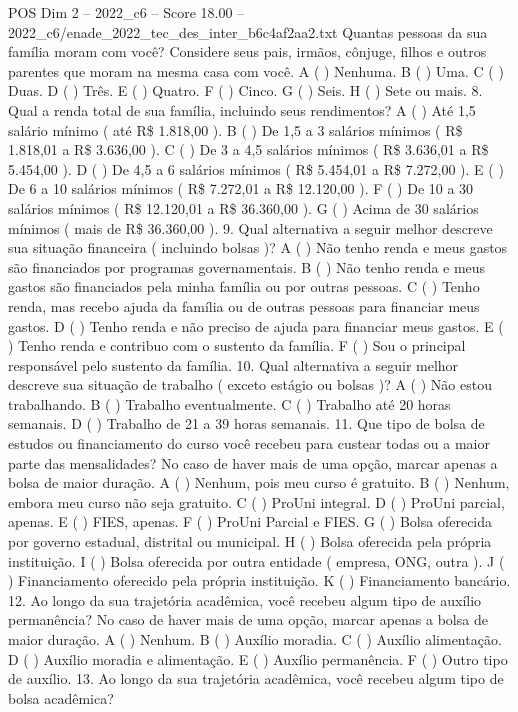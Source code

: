 \begin{textsample}{POS Dim 2 – 2022\_c6 – Score 18.00 – 2022\_c6/enade\_2022\_tec\_des\_inter\_b6c4af2aa2.txt}
Quantas pessoas da sua família moram com você?
Considere seus pais, irmãos, cônjuge, filhos e outros parentes que moram na mesma casa com você.
A ( ) Nenhuma.
B ( ) Uma.
C ( ) Duas.
D ( ) Três.
E ( ) Quatro.
F ( ) Cinco.
G ( ) Seis.
H ( ) Sete ou mais. 8.
Qual a renda total de sua família, incluindo seus rendimentos?
A ( ) Até 1,5 salário mínimo ( até R\$ 1.818,00 ).
B ( ) De 1,5 a 3 salários mínimos ( R\$ 1.818,01 a R\$ 3.636,00 ).
C ( ) De 3 a 4,5 salários mínimos ( R\$ 3.636,01 a R\$ 5.454,00 ).
D ( ) De 4,5 a 6 salários mínimos ( R\$ 5.454,01 a R\$ 7.272,00 ).
E ( ) De 6 a 10 salários mínimos ( R\$ 7.272,01 a R\$ 12.120,00 ).
F ( ) De 10 a 30 salários mínimos ( R\$ 12.120,01 a R\$ 36.360,00 ).
G ( ) Acima de 30 salários mínimos ( mais de R\$ 36.360,00 ). 9.
Qual alternativa a seguir melhor descreve sua situação financeira ( incluindo bolsas )?
A ( ) Não tenho renda e meus gastos são financiados por programas governamentais.
B ( ) Não tenho renda e meus gastos são financiados pela minha família ou por outras pessoas.
C ( ) Tenho renda, mas recebo ajuda da família ou de outras pessoas para financiar meus gastos.
D ( ) Tenho renda e não preciso de ajuda para financiar meus gastos.
E ( ) Tenho renda e contribuo com o sustento da família.
F ( ) Sou o principal responsável pelo sustento da família. 10.
Qual alternativa a seguir melhor descreve sua situação de trabalho ( exceto estágio ou bolsas )?
A ( ) Não estou trabalhando.
B ( ) Trabalho eventualmente.
C ( ) Trabalho até 20 horas semanais.
D ( ) Trabalho de 21 a 39 horas semanais. 11.
Que tipo de bolsa de estudos ou financiamento do curso você recebeu para custear todas ou a maior parte das mensalidades?
No caso de haver mais de uma opção, marcar apenas a bolsa de maior duração.
A ( ) Nenhum, pois meu curso é gratuito.
B ( ) Nenhum, embora meu curso não seja gratuito.
C ( ) ProUni integral.
D ( ) ProUni parcial, apenas.
E ( ) FIES, apenas.
F ( ) ProUni Parcial e FIES.
G ( ) Bolsa oferecida por governo estadual, distrital ou municipal.
H ( ) Bolsa oferecida pela própria instituição.
I ( ) Bolsa oferecida por outra entidade ( empresa, ONG, outra ).
J ( ) Financiamento oferecido pela própria instituição.
K ( ) Financiamento bancário. 12.
Ao longo da sua trajetória acadêmica, você recebeu algum tipo de auxílio permanência?
No caso de haver mais de uma opção, marcar apenas a bolsa de maior duração.
A ( ) Nenhum.
B ( ) Auxílio moradia.
C ( ) Auxílio alimentação.
D ( ) Auxílio moradia e alimentação.
E ( ) Auxílio permanência.
F ( ) Outro tipo de auxílio. 13.
Ao longo da sua trajetória acadêmica, você recebeu algum tipo de bolsa acadêmica?

\end{textsample}
